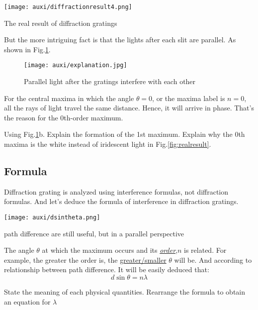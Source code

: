 \documentclass[a4paper]{tufte-handout}
\newenvironment{TaskBox} %
{\begin{tcolorbox}[breakable,colback=b1!30,colframe=b1,title=Task]} {\end{tcolorbox}}
\begin{document}
\begin{marginfigure}[-3cm]
\texttt{[image: auxi/diffractionresult4.png]}
\caption{The real result of diffraction gratings}
\label{fig:realresult}
\end{marginfigure}

But the more intriguing fact is that the lights after each slit are parallel. As shown in Fig.\ref{fig:explanation}.
\begin{figure}[h]
\centering
\texttt{[image: auxi/explanation.jpg]}
\caption{Parallel light after the gratings interfere with each other}
\label{fig:explanation}
\end{figure}

For the central maxima in which the angle $\theta=0$, or the maxima label is $n=0$, all the rays of light travel the same distance. Hence, it will arrive in phase. That's the reason for the 0th-order maximum.

\begin{TaskBox}
Using Fig.\ref{fig:explanation}b. Explain the formation of the 1st maximum.
\tcblower
Explain why the 0th maxima is the white instead of iridescent light in Fig.\ref{fig:realresult}.
\end{TaskBox}

\subsection{Formula}
Diffraction grating is analyzed using interference formulas, not diffraction formulas. And let's deduce the formula of interference in diffraction gratings.
\begin{marginfigure}
\centering
\texttt{[image: auxi/dsintheta.png]}
\caption{path difference are still useful, but in a parallel perspective}
\label{fig:pathd in gratings}
\end{marginfigure}
The angle \uline{$\theta$} at which the maximum occurs and its \uline{\emph{order},$n$} is related. For example, the greater the order is, the \uline{greater/smaller} $\theta$ will be. And according to relationship between path difference. It will be easily deduced that:
\[
  d\sin\theta=n\lambda
\]

\begin{TaskBox}
State the meaning of each physical quantities.
\tcblower
Rearrange the formula to obtain an equation for $\lambda$
\end{TaskBox}
\end{document}
